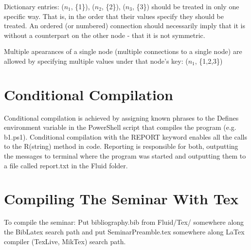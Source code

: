 Dictionary entries: ($n_1$, \{1\}), ($n_2$, \{2\}), ($n_3$, \{3\}) should be treated in only one specific way. That is, in the order that their values specify they should be treated. An ordered (or numbered) connection should necessarily imply that it is without a counterpart on the other node - that it is not symmetric.

Multiple apearances of a single node (multiple connections to a single node) are allowed by specifying multiple values under that node's key: ($n_1$, \{1,2,3\})

\setlength{\textheight}{26.4cm}
\pagebreak
\setlength{\topmargin}{1.6cm}			%
\setlength{\headheight}{0.0cm}
\setlength{\headsep}{0.0cm}			%
\fancyhf{}
\fancyfoot[C]{\thepage}

\section{Conditional Compilation}

Conditional compilation is achieved by assigning known phrases to the Defines environment variable in the PowerShell script that compiles the program (e.g. b1.ps1). Conditional compilation with the REPORT keyword enables all the calls to the R(string) method in code. Reporting is responsible for both, outputting the messages to terminal where the program was started and outputting them to a file called report.txt in the Fluid folder.

\section{Compiling The Seminar With Tex}

To compile the seminar: Put bibliography.bib from Fluid/Tex/ somewhere along the BibLatex search path and put SeminarPreamble.tex somewhere along LaTex compiler (TexLive, MikTex) search path.

